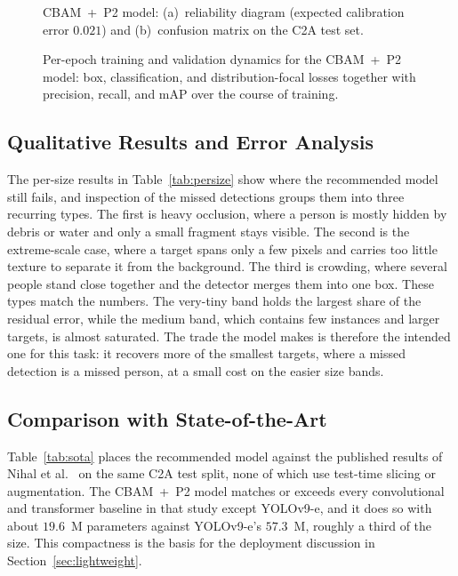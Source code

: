 \begin{figure}[tbp]
  \centering
  \begin{minipage}{0.49\linewidth}\centering
  \end{minipage}\hfill
  \begin{minipage}{0.49\linewidth}\centering
  \end{minipage}
  \caption{CBAM~+~P2 model: (a)~reliability diagram (expected calibration error
  $0.021$) and (b)~confusion matrix on the C2A test set.}
  \label{fig:calib}
\end{figure}

\begin{figure}[tbp]
  \centering
  \caption{Per-epoch training and validation dynamics for the CBAM~+~P2 model: box,
  classification, and distribution-focal losses together with precision, recall,
  and mAP over the course of training.}
  \label{fig:training}
\end{figure}

\subsection{Qualitative Results and Error Analysis}
The per-size results in Table~\ref{tab:persize} show where the recommended model
still fails, and inspection of the missed detections groups them into three
recurring types. The first is heavy occlusion, where a person is mostly hidden by
debris or water and only a small fragment stays visible. The second is the
extreme-scale case, where a target spans only a few pixels and carries too little
texture to separate it from the background. The third is crowding, where several
people stand close together and the detector merges them into one box. These types
match the numbers. The very-tiny band holds the largest share of the residual
error, while the medium band, which contains few instances and larger targets, is
almost saturated. The trade the model makes is therefore the intended one for this
task: it recovers more of the smallest targets, where a missed detection is a missed
person, at a small cost on the easier size bands.

\subsection{Comparison with State-of-the-Art}
Table~\ref{tab:sota} places the recommended model against the published results of
Nihal et al.~\cite{nihal2024c2a} on the same C2A test split, none of which use
test-time slicing or augmentation. The CBAM~+~P2 model matches or exceeds every
convolutional and transformer baseline in that study except YOLOv9-e, and it does
so with about $19.6$~M parameters against YOLOv9-e's $57.3$~M, roughly a third of the
size. This compactness is the basis for the deployment discussion in
Section~\ref{sec:lightweight}.

